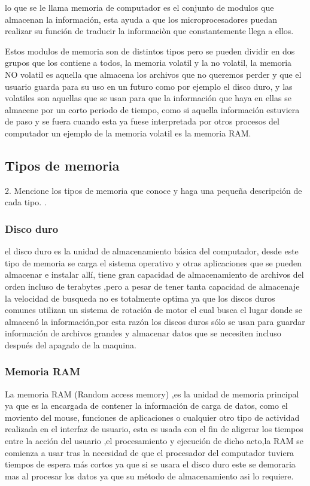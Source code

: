 \documentclass{article}
\begin{document}
lo que se le llama memoria de computador 
es el conjunto de modulos que almacenan 
la información, esta ayuda a que los microprocesadores puedan realizar su función de traducir la informaciòn que constantemente llega a ellos.

\vspace{0.3cm}
Estos modulos de memoria son de distintos tipos pero se pueden dividir en dos grupos que los contiene a todos, la memoria volatil y la no volatil, la memoria NO volatil es aquella que almacena los archivos que no queremos perder y que el usuario guarda para su uso en un futuro como por ejemplo el disco duro, y las volatiles son aquellas que se usan para que la información que haya en ellas se almacene por un corto periodo de tiempo, como si aquella información estuviera de paso y se fuera cuando esta ya fuese interpretada por otros procesos del computador un ejemplo de la memoria volatil es la memoria RAM.

\vfill
\vspace{0.9cm}
\subsection{Tipos de memoria}
2. Mencione los tipos de memoria que conoce y haga una pequeña descripción de cada tipo.
. \cite{refer}
\subsubsection{Disco duro}
el disco duro es la unidad de almacenamiento básica del computador, desde este tipo de memoria se carga el sistema operativo y otras aplicaciones que se pueden almacenar e instalar allí, tiene gran capacidad de almacenamiento de archivos del orden incluso de terabytes ,pero a pesar de tener tanta capacidad de almacenaje la velocidad de busqueda no es totalmente optima ya que los discos duros comunes utilizan un sistema de rotación de motor el cual busca el lugar donde se almacenó la información,por esta razón los discos duros sólo se usan para guardar información de archivos grandes y almacenar datos que se necesiten incluso después del apagado de la maquina.
\subsubsection{Memoria RAM}\label{memorias}
La memoria RAM (Random access memory) ,es la unidad de memoria principal ya que es la  encargada de contener la información de carga de datos, como el moviento del mouse, funciones de aplicaciones o cualquier otro tipo de actividad realizada en el interfaz de usuario, esta es usada con el fin de aligerar los tiempos entre la acción del usuario ,el procesamiento y ejecución de dicho acto,la RAM se comienza a usar tras la necesidad de que el procesador del computador tuviera tiempos de espera más cortos  ya que si se usara el disco duro este se demoraria mas al procesar los datos ya que su método de almacenamiento asi lo requiere.
\end{document}
